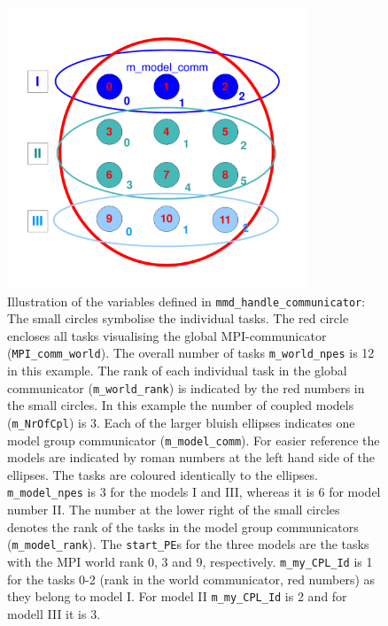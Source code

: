 \documentclass[twoside]{article}
\begin{document}
\begin{itemize}
\begin{itemize}
\begin{itemize}
\begin{figure}
\vspace*{-0.8cm}
\begin{center} 
\includegraphics[width=0.8\textwidth]{MMDlib_MPIcomm.pdf} 
\end{center} 
\vspace*{-0.8cm}
\caption{Illustration of the variables defined in 
{\tt mmd\_handle\_communicator}:
The small circles symbolise the individual tasks. The red circle encloses all 
tasks visualising the global MPI-communicator ({\tt MPI\_comm\_world}).
The overall number of tasks {\tt m\_world\_npes} is 12 in this example. The rank
of each individual task in the global communicator ({\tt m\_world\_rank}) is 
indicated by the red numbers in the small circles. In this example the number of
coupled models ({\tt m\_NrOfCpl}) is 3. Each of the larger bluish ellipses 
indicates one model group communicator ({\tt m\_model\_comm}). For easier 
reference the models are indicated by roman numbers at the left hand side of 
the ellipses. The tasks are coloured identically to the ellipses. 
{\tt m\_model\_npes} is 3 for the models I and III, whereas it is 6 for model 
number II.
The number at the lower right of the small circles denotes the rank of the tasks
in the model group communicators ({\tt m\_model\_rank}). 
The {\tt start\_PE}s for the three models are the tasks with the MPI world rank 
0, 3 and 9, respectively. {\tt m\_my\_CPL\_Id} is 1 for the tasks 0-2 (rank
in the world communicator, red numbers) as they belong to model I. For model II
{\tt m\_my\_CPL\_Id} is 2 and for modell III it is 3.} 

\label{fig:MPIcomm} 
\end{figure} 



\end{itemize}
\end{itemize}
\end{itemize}
\end{document}
